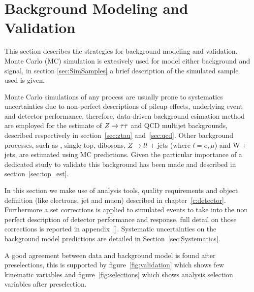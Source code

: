 \section{Background Modeling and Validation}
\label{sec:BackgroundEstimation}

This section describes the strategies for background modeling and validation.
Monte Carlo (MC) simulation is extesively used for model either background and signal, 
in section \ref{sec:SimSamples} a brief description of the simulated sample used is given.

Monte Carlo simulations of any process are usually prone to systematics
uncertainties due to non-perfect descriptions of pileup effects,
underlying event and detector performance, therefore,
data-driven background esimation method are employed for the estimate of $Z\rightarrow \tau\tau$ and QCD multijet backgrounds,
described respectively in section~\ref{sec:ztau} and~\ref{sec:qcd}.
Other background processes, such as \ttbar, single top, dibosons, $Z
\rightarrow ll$ + jets (where $l = e,\mu$) and W + jets, are estimated
using MC predictions. Given the particular importance of \ttbar a dedicated study to validate
this background has been made and described in section~\ref{sec:top_est}.

In this section we make use of analysis tools, quality requirements and object definition
(like electrons, jet and muon) described in chapter~\ref{c:detector}. Furthermore
a set corrections is applied to simulated events to take into the non perfect 
description of detector performance and response, full detail on those corrections
is reported in appendix~\ref{}.
Systematic uncertainties on the background model predictions 
are detailed in Section~\ref{sec:Systematics}.

A good agreement between data and background model is found after preselections, 
this is supported by figure~\ref{fig:validation} which shows few kinematic variables and
figure~\ref{fig:selections} which shows analysis selection variables after preselection.


